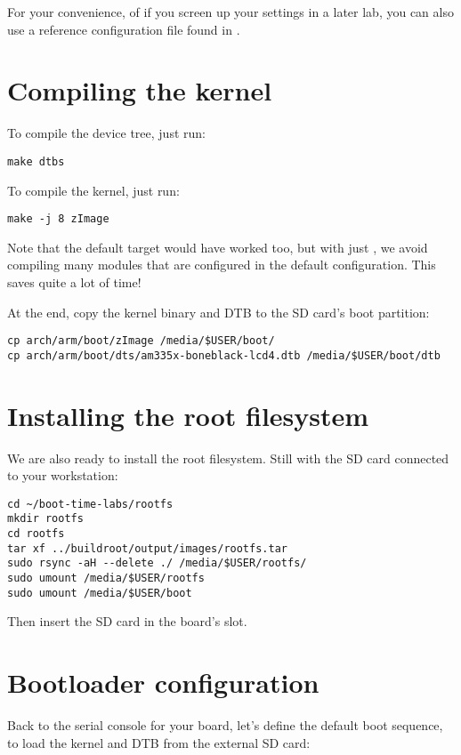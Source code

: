 For your convenience, of if you screen up your settings in a later lab,
you can also use a reference configuration file found in
.

\section{Compiling the kernel}

To compile the device tree, just run:
\begin{verbatim}
make dtbs
\end{verbatim}

To compile the kernel, just run:
\begin{verbatim}
make -j 8 zImage
\end{verbatim}

Note that the default  target would have worked too, but with
just , we avoid compiling many modules that are configured
in the default configuration. This saves quite a lot of time!

At the end, copy the kernel binary and DTB to the SD card's boot
partition:

\begin{verbatim}
cp arch/arm/boot/zImage /media/$USER/boot/
cp arch/arm/boot/dts/am335x-boneblack-lcd4.dtb /media/$USER/boot/dtb
\end{verbatim}

\section{Installing the root filesystem}

We are also ready to install the root filesystem. Still with the SD card
connected to your workstation:

\begin{verbatim}
cd ~/boot-time-labs/rootfs
mkdir rootfs
cd rootfs
tar xf ../buildroot/output/images/rootfs.tar
sudo rsync -aH --delete ./ /media/$USER/rootfs/
sudo umount /media/$USER/rootfs
sudo umount /media/$USER/boot
\end{verbatim}

Then insert the SD card in the board's slot.

\section{Bootloader configuration}

Back to the serial console for your board, let's define the default boot
sequence, to load the kernel and DTB from the external SD card:


